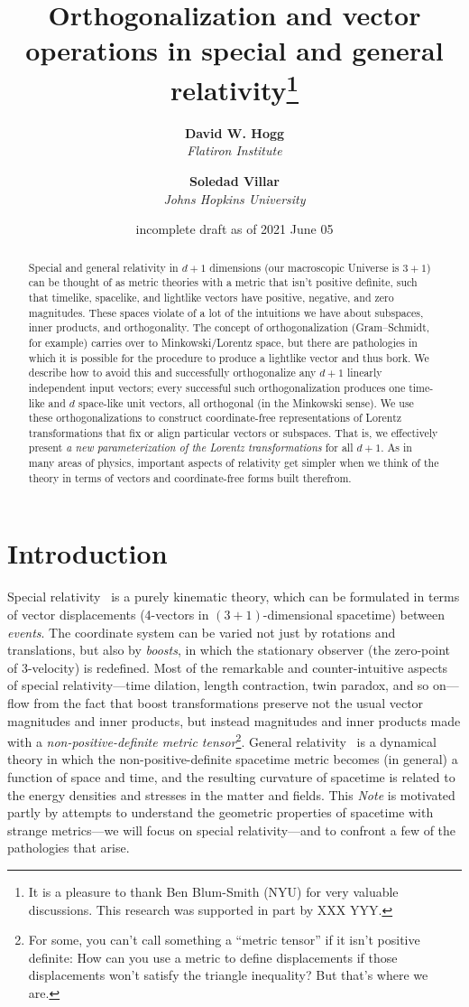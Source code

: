 \documentclass{article}
\title{\bfseries Orthogonalization and vector operations in special and general relativity\footnote{%
It is a pleasure to thank Ben Blum-Smith (NYU) for very valuable discussions. This research was supported in part by XXX YYY.}}
\author{\textbf{David W. Hogg}\\
        \textsl{Flatiron Institute}\\
        \and
        \textbf{Soledad Villar}\\
        \textsl{Johns Hopkins University}}
\date{incomplete draft as of 2021 June 05}
\newcommand{\documentname}{\textsl{Note}}
\begin{document}
\thispagestyle{plain}
\maketitle

\begin{abstract}\noindent
    Special and general relativity in $d+1$ dimensions (our macroscopic Universe is $3+1$) can be thought of as metric theories with a metric that isn't positive definite, such that timelike, spacelike, and lightlike vectors have positive, negative, and zero magnitudes.
    These spaces violate of a lot of the intuitions we have about subspaces, inner products, and orthogonality.
    The concept of orthogonalization (Gram--Schmidt, for example) carries over to Minkowski/Lorentz space, but there are pathologies in which it is possible for the procedure to produce a lightlike vector and thus bork.
    We describe how to avoid this and successfully orthogonalize any $d+1$ linearly independent input vectors; every successful such orthogonalization produces one time-like and $d$ space-like unit vectors, all orthogonal (in the Minkowski sense).
    We use these orthogonalizations to construct coordinate-free representations of Lorentz transformations that fix or align particular vectors or subspaces.
    That is, we effectively present \emph{a new parameterization of the Lorentz transformations} for all $d+1$.
    As in many areas of physics, important aspects of relativity get simpler when we think of the theory in terms of vectors and coordinate-free forms built therefrom.
\end{abstract}

\section{Introduction}\label{sec:intro}

Special relativity~\cite{sr} is a purely kinematic theory, which can be formulated in terms of vector displacements (4-vectors in $(3+1)$-dimensional spacetime) between \emph{events}.
The coordinate system can be varied not just by rotations and translations, but also by \emph{boosts}, in which the stationary observer (the zero-point of 3-velocity) is redefined.
Most of the remarkable and counter-intuitive aspects of special relativity---time dilation, length contraction, twin paradox, and so on---flow from the fact that boost transformations preserve not the usual vector magnitudes and inner products, but instead magnitudes and inner products made with a \emph{non-positive-definite metric tensor}\footnote{For some, you can't call something a ``metric tensor'' if it isn't positive definite: How can you use a metric to define displacements if those displacements won't satisfy the triangle inequality? But that's where we are.}.
General relativity~\cite{gr} is a dynamical theory in which the non-positive-definite spacetime metric becomes (in general) a function of space and time, and the resulting curvature of spacetime is related to the energy densities and stresses in the matter and fields.
This \documentname{} is motivated partly by attempts to understand the geometric properties of spacetime with strange metrics---we will focus on special relativity---and to confront a few of the pathologies that arise.
\end{document}
